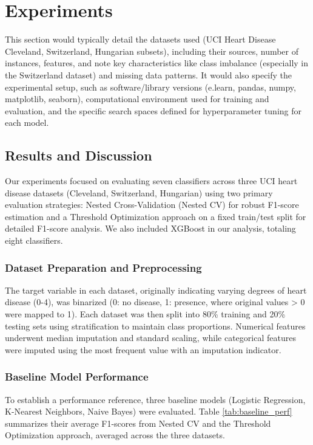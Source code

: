 \documentclass{article}
\begin{document}
\section{Experiments}
This section would typically detail the datasets used (UCI Heart Disease Cleveland, Switzerland, Hungarian subsets), including their sources, number of instances, features, and note key characteristics like class imbalance (especially in the Switzerland dataset) and missing data patterns. It would also specify the experimental setup, such as software/library versions (e.learn, pandas, numpy, matplotlib, seaborn), computational environment used for training and evaluation, and the specific search spaces defined for hyperparameter tuning for each model.

\subsection{Results and Discussion}
Our experiments focused on evaluating seven classifiers across three UCI heart disease datasets (Cleveland, Switzerland, Hungarian) using two primary evaluation strategies: Nested Cross-Validation (Nested CV) for robust F1-score estimation and a Threshold Optimization approach on a fixed train/test split for detailed F1-score analysis. We also included XGBoost in our analysis, totaling eight classifiers.

\subsubsection{Dataset Preparation and Preprocessing}
The target variable in each dataset, originally indicating varying degrees of heart disease (0-4), was binarized (0: no disease, 1: presence, where original values > 0 were mapped to 1). Each dataset was then split into 80\% training and 20\% testing sets using stratification to maintain class proportions. Numerical features underwent median imputation and standard scaling, while categorical features were imputed using the most frequent value with an imputation indicator.

\subsubsection{Baseline Model Performance}
To establish a performance reference, three baseline models (Logistic Regression, K-Nearest Neighbors, Naive Bayes) were evaluated. Table \ref{tab:baseline_perf} summarizes their average F1-scores from Nested CV and the Threshold Optimization approach, averaged across the three datasets.
\end{document}
